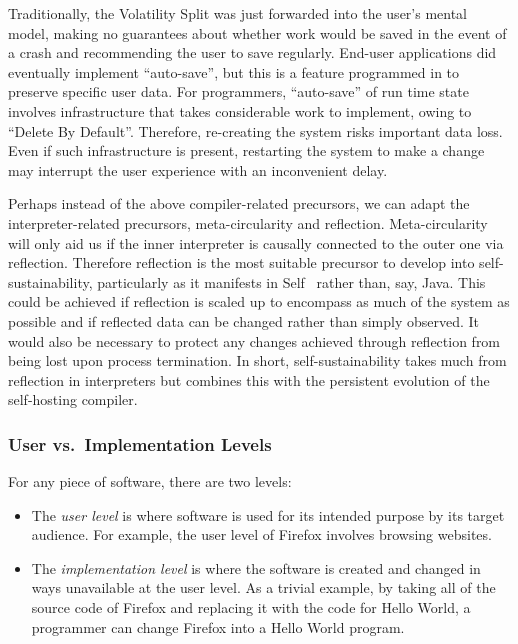\documentclass[ twoside,openright,titlepage,numbers=noenddot,headinclude,footinclude,cleardoublepage=empty,abstract=on,
                BCOR=5mm,paper=a4,fontsize=11pt
                ]{scrreprt}
\providecommand{\tightlist}{}\newenvironment{longtable}[2]{\begin{tabular}}{\end{tabular}}
\theoremstyle{definition}
\begin{document}
Traditionally, the Volatility Split was just forwarded into the user's
mental model, making no guarantees about whether work would be saved in
the event of a crash and recommending the user to save regularly.
End-user applications did eventually implement ``auto-save'', but this
is a feature programmed in to preserve specific user data. For
programmers, ``auto-save'' of run time state involves infrastructure
that takes considerable work to implement, owing to ``Delete By
Default''. Therefore, re-creating the system risks important data loss.
Even if such infrastructure is present, restarting the system to make a
change may interrupt the user experience with an inconvenient delay.

Perhaps instead of the above compiler-related precursors, we can adapt
the interpreter-related precursors, meta-circularity and reflection.
Meta-circularity will only aid us if the inner interpreter is causally
connected to the outer one via reflection. Therefore reflection is the
most suitable precursor to develop into self-sustainability,
particularly as it manifests in Self~\parencite{Self} rather than, say,
Java. This could be achieved if reflection is scaled up to encompass as
much of the system as possible and if reflected data can be changed
rather than simply observed. It would also be necessary to protect any
changes achieved through reflection from being lost upon process
termination. In short, self-sustainability takes much from reflection in
interpreters but combines this with the persistent evolution of the
self-hosting compiler.

\hypertarget{user-vs.-implementation-levels}{\subsubsection{User vs.~Implementation
Levels}\label{user-vs.-implementation-levels}}

For any piece of software, there are two levels:

\begin{itemize}
\tightlist
\item
  The \emph{user level} is where software is used for its intended
  purpose by its target audience. For example, the user level of Firefox
  involves browsing websites.
\item
  The \emph{implementation level} is where the software is created and
  changed in ways unavailable at the user level. As a trivial example,
  by taking all of the source code of Firefox and replacing it with the
  code for Hello World, a programmer can change Firefox into a Hello
  World program.
\end{itemize}
\end{document}
